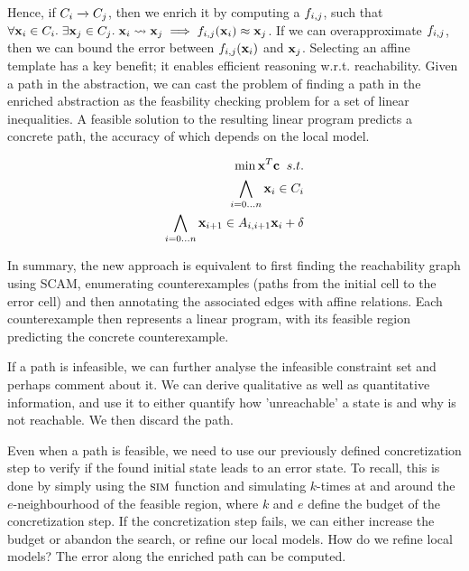 Hence, if $C_i \xrightarrow{} C_j$, then we enrich it by computing a
$f_{i,j}$, such that $\forall \mathbf{x}_i \in C_i.\; \exists \mathbf{x}_j \in
C_j.\; \mathbf{x}_i \overset{}{\rightsquigarrow} \mathbf{x}_j \implies f_{i,j}(\mathbf{x}_i) \approx \mathbf{x}_j$.
If we can overapproximate $f_{i,j}$, then we can bound the error
between $f_{i,j}(\mathbf{x}_i)$ and $\mathbf{x}_j$. Selecting an affine template
has a key benefit; it enables efficient reasoning w.r.t. reachability.
Given a path in the abstraction, we can cast the problem of finding a
path in the enriched abstraction as the feasbility checking problem
for a set of linear inequalities.  A feasible solution to the
resulting linear program predicts a concrete path, the accuracy of
which depends on the local model.

\begin{align}
\min \mathbf{x}^T \mathbf{c}\;\; s.t.\\
\bigwedge_{i=0\ldots n} \mathbf{x}_i \in C_i\\
\bigwedge_{i=0\ldots n} \mathbf{x}_{i+1} \in A_{i,i+1}\mathbf{x}_i + \delta
\end{align}

In summary, the new approach is equivalent to first finding the
reachability graph using SCAM, enumerating counterexamples (paths from
the initial cell to the error cell) and then annotating the associated
edges with affine relations. Each counterexample then represents a
linear program, with its feasible region predicting the concrete
counterexample.

If a path is infeasible, we can further analyse the infeasible
constraint set and perhaps comment about it. We can derive
qualitative as well as quantitative information, and use it to either
quantify how 'unreachable' a state is and why is not reachable. We
then discard the path.




Even when a path is feasible, we need to use our previously defined
concretization step to verify if the found initial state leads to an
error state. To recall, this is done by simply using the $\mbox{\sc sim}$
function and simulating $k$-times at and around the $e$-neighbourhood
of the feasible region, where $k$ and $e$ define the budget of the
concretization step. If the concretization step fails, we can either
increase the budget or abandon the search, or refine our local models.
How do we refine local models? The error along the enriched path can
be computed. %

